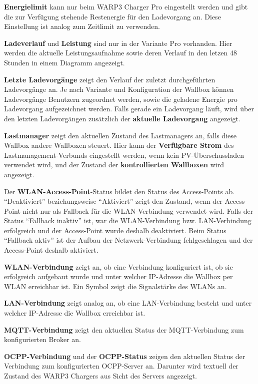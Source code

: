 \documentclass[a4paper,10pt]{article}
\begin{document}
\begin{multicols*}{2}
    \textbf{Energielimit} kann nur beim WARP3 Charger Pro eingestellt werden und gibt die zur Verfügung stehende Restenergie für den
    Ladevorgang an. Diese Einstellung ist analog zum Zeitlimit zu verwenden.

    \textbf{Ladeverlauf} und \textbf{Leistung} sind nur in der Variante Pro
    vorhanden. Hier werden die aktuelle Leistungsaufnahme sowie deren Verlauf in den letzen 48 Stunden in einem Diagramm angezeigt.

    \textbf{Letzte Ladevorgänge} zeigt den Verlauf der zuletzt durchgeführten
	Ladevorgänge an. Je nach Variante und Konfiguration der Wallbox können Ladevorgänge Benutzern
	zugeordnet werden, sowie die geladene Energie pro Ladevorgang aufgezeichnet werden. Falls gerade ein Ladevorgang läuft,
	wird über den letzten Ladevorgängen zusätzlich der \textbf{aktuelle Ladevorgang} angezeigt.

    \textbf{Lastmanager} zeigt den aktuellen Zustand des Lastmanagers an, falls diese Wallbox
    andere Wallboxen steuert. Hier kann der \textbf{Verfügbare Strom} des Lastmanagement-Verbunds
    eingestellt werden, wenn kein PV-Überschussladen verwendet wird, und der Zustand der \textbf{kontrollierten Wallboxen} wird angezeigt.


    Der \textbf{WLAN-Access-Point}-Status bildet den Status des Access-Points ab.
    \enquote{Deaktiviert} beziehungsweise \enquote{Aktiviert} zeigt den Zustand, wenn der Access-Point nicht
    nur als Fallback für die WLAN-Verbindung verwendet wird. Falls der Status \enquote{Fallback inaktiv} ist,
    war die WLAN-Verbindung bzw. LAN-Verbindung erfolgreich und der Access-Point wurde deshalb deaktiviert.
    Beim Status \enquote{Fallback aktiv} ist der Aufbau der Netzwerk-Verbindung fehlgeschlagen und der
    Access-Point deshalb aktiviert.

    \textbf{WLAN-Verbindung} zeigt an, ob eine Verbindung konfiguriert ist, ob sie erfolgreich aufgebaut wurde und
    unter welcher IP-Adresse die Wallbox per WLAN erreichbar ist. Ein Symbol
    zeigt die Signalstärke des WLANs an.

    \textbf{LAN-Verbindung} zeigt analog an, ob eine LAN-Verbindung besteht und unter welcher IP-Adresse die Wallbox erreichbar ist.

    \textbf{MQTT-Verbindung} zeigt den aktuellen Status der MQTT-Verbindung
    zum konfigurierten Broker an.

    \textbf{OCPP-Verbindung} und der \textbf{OCPP-Status} zeigen den aktuellen Status der Verbindung zum konfigurierten OCPP-Server an.
    Darunter wird textuell der Zustand des WARP3 Chargers aus Sicht des Servers angezeigt.


\end{multicols*}
\end{document}
